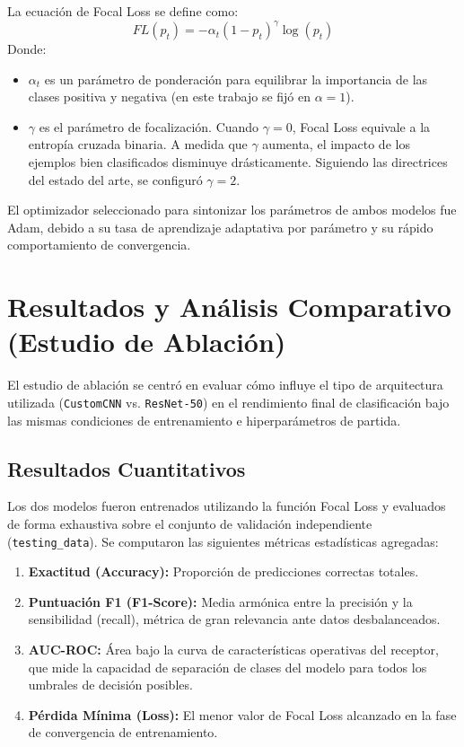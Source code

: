 \documentclass{article}
\begin{document}
La ecuación de Focal Loss se define como:
\begin{equation}
FL(p_t) = -\alpha_t (1 - p_t)^\gamma \log(p_t)
\end{equation}
Donde:
\begin{itemize}
    \item $\alpha_t$ es un parámetro de ponderación para equilibrar la importancia de las clases positiva y negativa (en este trabajo se fijó en $\alpha = 1$).
    \item $\gamma$ es el parámetro de focalización. Cuando $\gamma = 0$, Focal Loss equivale a la entropía cruzada binaria. A medida que $\gamma$ aumenta, el impacto de los ejemplos bien clasificados disminuye drásticamente. Siguiendo las directrices del estado del arte, se configuró $\gamma = 2$.
\end{itemize}

El optimizador seleccionado para sintonizar los parámetros de ambos modelos fue Adam, debido a su tasa de aprendizaje adaptativa por parámetro y su rápido comportamiento de convergencia.

\section{Resultados y Análisis Comparativo (Estudio de Ablación)}
El estudio de ablación se centró en evaluar cómo influye el tipo de arquitectura utilizada (\texttt{CustomCNN} vs. \texttt{ResNet-50}) en el rendimiento final de clasificación bajo las mismas condiciones de entrenamiento e hiperparámetros de partida.

\subsection{Resultados Cuantitativos}
Los dos modelos fueron entrenados utilizando la función Focal Loss y evaluados de forma exhaustiva sobre el conjunto de validación independiente (\texttt{testing\_data}). Se computaron las siguientes métricas estadísticas agregadas:
\begin{enumerate}
    \item \textbf{Exactitud (Accuracy):} Proporción de predicciones correctas totales.
    \item \textbf{Puntuación F1 (F1-Score):} Media armónica entre la precisión y la sensibilidad (recall), métrica de gran relevancia ante datos desbalanceados.
    \item \textbf{AUC-ROC:} Área bajo la curva de características operativas del receptor, que mide la capacidad de separación de clases del modelo para todos los umbrales de decisión posibles.
    \item \textbf{Pérdida Mínima (Loss):} El menor valor de Focal Loss alcanzado en la fase de convergencia de entrenamiento.
\end{enumerate}
\end{document}
